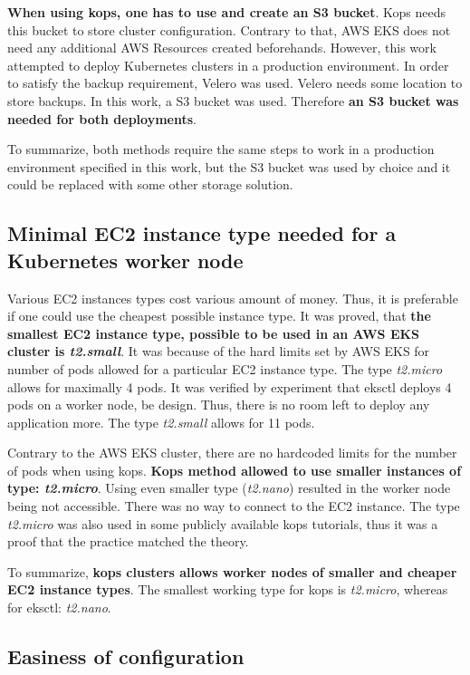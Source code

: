 \textbf{When using kops, one has to use and create an S3 bucket}. Kops needs this bucket to store cluster configuration. Contrary to that, AWS EKS does not need any additional AWS Resources created beforehands. However, this work attempted to deploy Kubernetes clusters in a production environment. In order to satisfy the backup requirement, Velero was used. Velero needs some location to store backups. In this work, a S3 bucket was used. Therefore \textbf{an S3 bucket was needed for both deployments}.

To summarize, both methods require the same steps to work in a production environment specified in this work, but the S3 bucket was used by choice and it could be replaced with some other storage solution.

\subsection{Minimal EC2 instance type needed for a Kubernetes worker node}
Various EC2 instances types cost various amount of money. Thus, it is preferable if one could use the cheapest possible instance type. It was proved, that \textbf{the smallest EC2 instance type, possible to be used in an AWS EKS cluster is \textit{t2.small}}. It was because of the hard limits set by AWS EKS for number of pods allowed for a particular EC2 instance type. The type \textit{t2.micro} allows for maximally 4 pods\cite{eks-hard-limits}. It was verified by experiment that eksctl deploys 4 pods on a worker node, be design. Thus, there is no room left to deploy any application more. The type \textit{t2.small} allows for 11 pods.

Contrary to the AWS EKS cluster, there are no hardcoded limits for the number of pods when using kops. \textbf{Kops method allowed to use smaller instances of type: \textit{t2.micro}}. Using even smaller type (\textit{t2.nano}) resulted in the worker node being not accessible. There was no way to connect to the EC2 instance. The type \textit{t2.micro} was also used in some publicly available kops tutorials, thus it was a proof that the practice matched the theory.

To summarize, \textbf{kops clusters allows worker nodes of smaller and cheaper EC2 instance types}. The smallest working type for kops is \textit{t2.micro}, whereas for eksctl: \textit{t2.nano}.

\subsection{Easiness of configuration}

